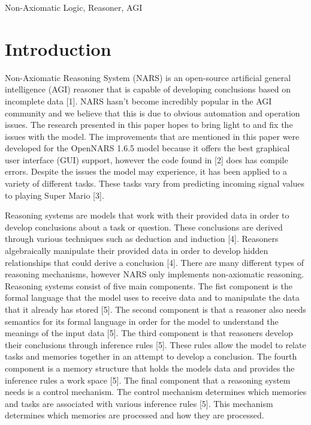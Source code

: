 \documentclass[conference]{IEEEtran}
\begin{document}
\begin{IEEEkeywords} Non-Axiomatic Logic, Reasoner, AGI
\end{IEEEkeywords}

\section{Introduction}

	Non-Axiomatic Reasoning System (NARS) is an open-source artificial general intelligence (AGI) reasoner that is capable of developing conclusions based on incomplete data [1]. NARS hasn't become incredibly popular in the AGI community and we believe that this is due to obvious automation and operation issues. The research presented in this paper hopes to bring light to and fix the issues with the model. The improvements that are mentioned in this paper were developed for the OpenNARS 1.6.5 model because it offers the best graphical user interface (GUI) support, however the code found in [2] does has compile errors. Despite the issues the model may experience, it has been applied to a variety of different tasks. These tasks vary from predicting incoming signal values to playing Super Mario [3]. 
	
	Reasoning systems are models that work with their provided data in order to develop conclusions about a task or question. These conclusions are derived through various techniques such as deduction and induction [4]. Reasoners algebraically manipulate their provided data in order to develop hidden relationships that could derive a conclusion [4]. There are many different types of reasoning mechanisms, however NARS only implements non-axiomatic reasoning. Reasoning systems consist of five main components. The fist component is the formal language that the model uses to receive data and to manipulate the data that it already has stored [5]. The second component is that a reasoner also needs semantics for its formal language in order for the model to understand the meanings of the input data [5]. The third component is that reasoners develop their conclusions through inference rules [5]. These rules allow the model to relate tasks and memories together in an attempt to develop a conclusion. The fourth component is a memory structure that holds the models data and provides the inference rules a work space [5]. The final component that a reasoning system needs is a control mechanism. The control mechanism determines which memories and tasks are associated with various inference rules [5]. This mechanism determines which memories are processed and how they are processed.
	
\end{document}
